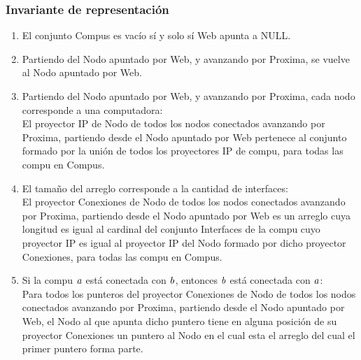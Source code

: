 

\subsubsection*{Invariante de representación}

\begin{enumerate}
	\item El conjunto Compus es vacío sí y solo sí Web apunta a NULL.
	\item Partiendo del Nodo apuntado por Web, y avanzando por Proxima, se vuelve al Nodo apuntado por Web.
	\item Partiendo del Nodo apuntado por Web, y avanzando por Proxima, cada nodo corresponde a una computadora: \\El proyector IP de Nodo de todos los nodos conectados avanzando por Proxima, partiendo desde el Nodo apuntado por Web pertenece al conjunto formado por la unión de todos los proyectores IP de compu, para todas las compu en Compus.
	\item El tamaño del arreglo corresponde a la cantidad de interfaces: \\El proyector Conexiones de Nodo de todos los nodos conectados avanzando por Proxima, partiendo desde el Nodo apuntado por Web es un arreglo cuya longitud es igual al cardinal del conjunto Interfaces de la compu cuyo proyector IP es igual al proyector IP del Nodo formado por dicho proyector Conexiones, para todas las compu en Compus.
	\item Si la compu $\text{\textit{a}}$ está conectada con $\text{\textit{b}}$, entonces $\text{\textit{b}}$ está conectada con $\text{\textit{a}}$: \\Para todos los punteros del proyector Conexiones de Nodo de todos los nodos conectados avanzando por Proxima, partiendo desde el Nodo apuntado por Web, el Nodo al que apunta dicho puntero tiene en alguna posición de su proyector Conexiones un puntero al Nodo en el cual esta el arreglo del cual el primer puntero forma parte.
	

		\end{enumerate}

